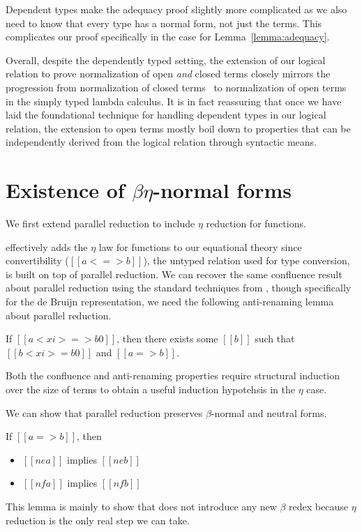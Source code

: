 \documentclass[acmsmall,screen=true,
\ifpublic review=false\else,review=true\fi
  ,anonymous=\ifanonymous true\else false\fi]{acmart}
\newcommand{\scw}[1]{}
\begin{document}
Dependent types make the adequacy proof slightly more complicated
as we also need to know that every type has a normal form, not just
the terms.
This complicates our proof specifically in the  case for
Lemma~\ref{lemma:adequacy}.

Overall, despite the dependently typed setting,
the extension of our logical relation to prove normalization of open
\emph{and} closed terms closely mirrors the progression from
normalization of closed terms~\citep{harpertait} to normalization of
open terms~\citep{harperkripke} in the simply typed lambda calculus.
It is in fact reassuring that once we have laid the foundational
technique for handling dependent types in our logical relation, the
extension to open terms mostly boil down to properties that can be
independently derived from the logical relation through syntactic
means.

\section{Existence of $\beta\eta$-normal forms}
\scw{relocated text from previous section. Not a complete description yet.}

We first extend parallel reduction to include $\eta$ reduction for functions.
\begin{center}
\end{center}

 effectively adds the $\eta$ law for functions to our
equational theory since convertibility ($[[a <=> b]]$), the untyped relation
used for type conversion, is built on top of parallel reduction. We can
recover the same confluence result about parallel reduction using the standard
techniques from \citet{barendregt:lambda-calculi-with-types,
  takahashi-parallel-reduction}, though specifically for the de Bruijn
representation, we need the following anti-renaming lemma about parallel
reduction.
\begin{lemma}
  \label{lemma:parantirenaming} If $[[a < xi > => b0]]$, then there
exists some $[[b]]$ such that $[[b < xi > = b0]]$ and $[[a => b]]$.
\end{lemma}
Both the confluence and anti-renaming properties require structural
induction over the size of terms to obtain a useful induction
hypotehsis in the $\eta$ case.

We can show that parallel reduction preserves $\beta$-normal and
neutral forms.
\begin{lemma}
  \label{lemma:parnenf}
  If $[[a => b]]$, then
  \begin{itemize}
  \item $[[ne a]]$ implies $[[ne b]]$
  \item $[[nf a]]$ implies $[[nf b]]$
  \end{itemize}
\end{lemma}
This lemma is mainly to show that  does not introduce
any new $\beta$ redex because $\eta$ reduction is the only real step
we can take.
\end{document}
